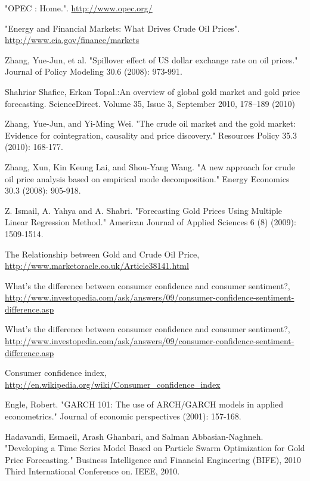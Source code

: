 \documentclass[runningheads]{llncs}
\begin{document}
\begin{thebibliography}{4}
 "OPEC : Home.". \url{http://www.opec.org/}

 "Energy and Financial Markets: What Drives Crude Oil Prices". \url{http://www.eia.gov/finance/markets}

 Zhang, Yue-Jun, et al. "Spillover effect of US dollar exchange rate on oil prices." Journal of Policy Modeling 30.6 (2008): 973-991.

 Shahriar Shafiee,  Erkan Topal.:An overview of global gold market and gold price forecasting. ScienceDirect. Volume 35, Issue 3, September 2010, 178--189 (2010)

 Zhang, Yue-Jun, and Yi-Ming Wei. "The crude oil market and the gold market: Evidence for cointegration, causality and price discovery." Resources Policy 35.3 (2010): 168-177.

Zhang, Xun, Kin Keung Lai, and Shou-Yang Wang. "A new approach for crude oil price analysis based on empirical mode decomposition." Energy Economics 30.3 (2008): 905-918.

Z. Ismail, A. Yahya and A. Shabri. "Forecasting Gold Prices Using Multiple Linear Regression Method." American Journal of Applied Sciences 6 (8) (2009): 1509-1514.

 The Relationship between Gold and Crude Oil Price, \url{http://www.marketoracle.co.uk/Article38141.html}

 What's the difference between consumer confidence and consumer sentiment?, \url{http://www.investopedia.com/ask/answers/09/consumer-confidence-sentiment-difference.asp}

 What's the difference between consumer confidence and consumer sentiment?, \url{http://www.investopedia.com/ask/answers/09/consumer-confidence-sentiment-difference.asp}

 Consumer confidence index, \url{http://en.wikipedia.org/wiki/Consumer_confidence_index}

 Engle, Robert. "GARCH 101: The use of ARCH/GARCH models in applied econometrics." Journal of economic perspectives (2001): 157-168.

Hadavandi, Esmaeil, Arash Ghanbari, and Salman Abbasian-Naghneh. "Developing a Time Series Model Based on Particle Swarm Optimization for Gold Price Forecasting." Business Intelligence and Financial Engineering (BIFE), 2010 Third International Conference on. IEEE, 2010.


\end{thebibliography}
\end{document}
